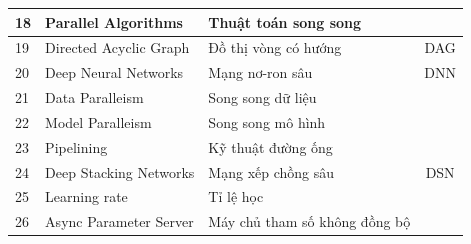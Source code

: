 \documentclass[11pt,a4paper]{article}
\numberwithin{equation}{subsection}
\numberwithin{figure}{subsection}
\numberwithin{table}{subsection}
\begin{document}
\begin{tabular}{|l|l|l|c|}
18           & Parallel Algorithms                                                       & Thuật toán song song                                                       &                      \\ \hline
19           & Directed Acyclic Graph                                                    & Đồ thị vòng có hướng                                                       & DAG                  \\ \hline
20           & Deep Neural Networks                                                      & Mạng nơ-ron sâu                                                            & DNN                  \\ \hline
21           & Data Paralleism                                                           & Song song dữ liệu                                                          &                      \\ \hline
22           & Model Paralleism                                                          & Song song mô hình                                                          &                      \\ \hline
23           & Pipelining                                                                & Kỹ thuật đường ống                                                         &                      \\ \hline
24           & Deep Stacking Networks                                                    & Mạng xếp chồng sâu                                                         & DSN                  \\ \hline
25             &  Learning rate                                                                         &                                                                  Tỉ lệ học       &                      \\ \hline
 26            &   Async Parameter Server                                                                        &                                                                         Máy chủ tham số không đồng bộ   &                      \\ \hline

\end{tabular}




\newpage

\listoffigures
\end{document}
